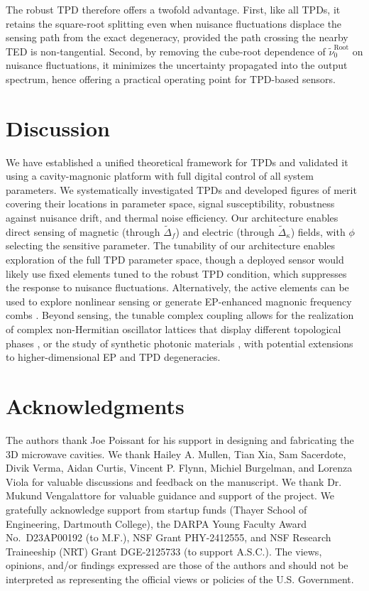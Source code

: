 \documentclass[%
  reprint,
  amsmath,amssymb,
  aps,
  prapplied,
  superscriptaddress,
  longbibliography]{revtex4-2}
\begin{document}
The robust TPD therefore offers a twofold advantage. First, like all TPDs, it retains the square-root splitting even when nuisance fluctuations displace the sensing path from the exact degeneracy, provided the path crossing the nearby TED is non-tangential. Second, by removing the cube-root dependence of $\tilde{\nu}_0^\text{Root}$ on nuisance fluctuations, it minimizes the uncertainty propagated into the output spectrum, hence offering a practical operating point for TPD-based sensors.

\section{\label{sec:discussion} Discussion}

We have established a unified theoretical framework for TPDs and validated it using a cavity-magnonic platform with full digital control of all system parameters. We systematically investigated TPDs and developed figures of merit covering their locations in parameter space, signal susceptibility, robustness against nuisance drift, and thermal noise efficiency. Our architecture enables direct sensing of magnetic (through $\tilde{\Delta}_f$) and electric (through $\tilde{\Delta}_\kappa$) fields, with $\phi$ selecting the sensitive parameter. The tunability of our architecture enables exploration of the full TPD parameter space, though a deployed sensor would likely use fixed elements tuned to the robust TPD condition, which suppresses the response to nuisance fluctuations. Alternatively, the active elements can be used to explore nonlinear sensing or generate EP-enhanced magnonic frequency combs \cite{zheng_noise_2025, bai_observation_2024, wang_enhancement_2024}. Beyond sensing, the tunable complex coupling allows for the realization of complex non-Hermitian oscillator lattices that display different topological phases \cite{okugawa_topological_2019, tang_exceptional_2020}, or the study of synthetic photonic materials \cite{owens_quarter-flux_2018, kollar_hyperbolic_2019}, with potential extensions to higher-dimensional EP \cite{zhang_higher-order_2019, hodaei_enhanced_2017} and TPD degeneracies.

\section{\label{sec:acknowledgements} Acknowledgments}

The authors thank Joe Poissant for his support in designing and fabricating the 3D microwave cavities. We thank Hailey A. Mullen, Tian Xia, Sam Sacerdote, Divik Verma, Aidan Curtis, Vincent P. Flynn, Michiel Burgelman, and Lorenza Viola for valuable discussions and feedback on the manuscript. We thank Dr. Mukund Vengalattore for valuable guidance and support of the project. We gratefully acknowledge support from startup funds (Thayer School of Engineering, Dartmouth College), the DARPA Young Faculty Award No.~D23AP00192 (to M.F.), NSF Grant PHY-2412555, and NSF Research Traineeship (NRT) Grant DGE-2125733 (to support A.S.C.). The views, opinions, and/or findings expressed are those of the authors and should not be interpreted as representing the official views or policies of the U.S. Government.
\end{document}
